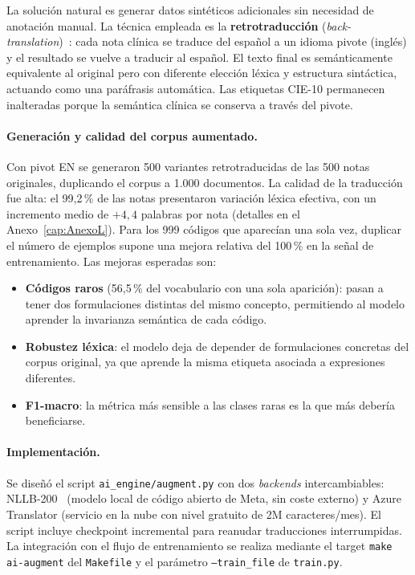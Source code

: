 La solución natural es generar datos sintéticos adicionales sin necesidad de anotación manual. La técnica empleada es la \textbf{retrotraducción} (\emph{back-translation})~\cite{sennrich2016improving}: cada nota clínica se traduce del español a un idioma pivote (inglés) y el resultado se vuelve a traducir al español. El texto final es semánticamente equivalente al original pero con diferente elección léxica y estructura sintáctica, actuando como una paráfrasis automática. Las etiquetas CIE-10 permanecen inalteradas porque la semántica clínica se conserva a través del pivote.

\paragraph{Generación y calidad del corpus aumentado.}
Con pivot EN se generaron 500 variantes retrotraducidas de las 500 notas originales, duplicando el corpus a 1.000 documentos. La calidad de la traducción fue alta: el 99,2\,\% de las notas presentaron variación léxica efectiva, con un incremento medio de $+4{,}4$ palabras por nota (detalles en el Anexo~\ref{cap:AnexoL}). Para los 999 códigos que aparecían una sola vez, duplicar el número de ejemplos supone una mejora relativa del 100\,\% en la señal de entrenamiento. Las mejoras esperadas son:

\begin{itemize}
 \item \textbf{Códigos raros} (56,5\,\% del vocabulario con una sola aparición): pasan a tener dos formulaciones distintas del mismo concepto, permitiendo al modelo aprender la invarianza semántica de cada código.
 \item \textbf{Robustez léxica}: el modelo deja de depender de formulaciones concretas del corpus original, ya que aprende la misma etiqueta asociada a expresiones diferentes.
 \item \textbf{F1-macro}: la métrica más sensible a las clases raras es la que más debería beneficiarse.
\end{itemize}

\paragraph{Implementación.}
Se diseñó el script \texttt{ai\_engine/augment.py} con dos \emph{backends} intercambiables: NLLB-200~\cite{costa-jussa2022nllb200} (modelo local de código abierto de Meta, sin coste externo) y Azure Translator (servicio en la nube con nivel gratuito de 2M caracteres/mes). El script incluye checkpoint incremental para reanudar traducciones interrumpidas. La integración con el flujo de entrenamiento se realiza mediante el target \texttt{make ai-augment} del \texttt{Makefile} y el parámetro \texttt{--train\_file} de \texttt{train.py}.

